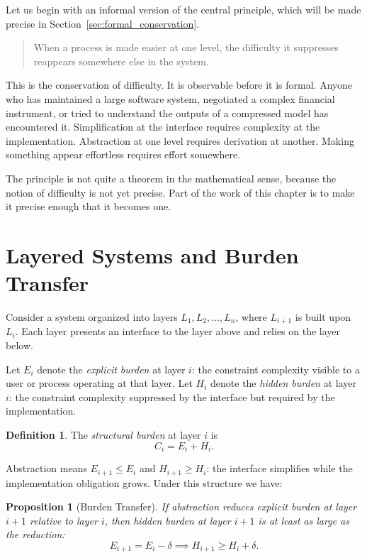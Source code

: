 \documentclass[12pt,a4paper,openany]{book}
\theoremstyle{plain}
\newtheorem{proposition}[theorem]{Proposition}
\theoremstyle{definition}
\newtheorem{definition}[theorem]{Definition}
\theoremstyle{remark}
\begin{document}
Let us begin with an informal version of the central principle, which will be made precise in Section~\ref{sec:formal_conservation}.

\begin{quote}
When a process is made easier at one level, the difficulty it suppresses reappears somewhere else in the system.
\end{quote}

This is the conservation of difficulty. It is observable before it is formal. Anyone who has maintained a large software system, negotiated a complex financial instrument, or tried to understand the outputs of a compressed model has encountered it. Simplification at the interface requires complexity at the implementation. Abstraction at one level requires derivation at another. Making something appear effortless requires effort somewhere.

The principle is not quite a theorem in the mathematical sense, because the notion of difficulty is not yet precise. Part of the work of this chapter is to make it precise enough that it becomes one.

\section{Layered Systems and Burden Transfer}

Consider a system organized into layers $L_1, L_2, \ldots, L_n$, where $L_{i+1}$ is built upon $L_i$. Each layer presents an interface to the layer above and relies on the layer below.

Let $E_i$ denote the \emph{explicit burden} at layer $i$: the constraint complexity visible to a user or process operating at that layer. Let $H_i$ denote the \emph{hidden burden} at layer $i$: the constraint complexity suppressed by the interface but required by the implementation.

\begin{definition}
The \emph{structural burden} at layer $i$ is
\[
C_i = E_i + H_i.
\]
\end{definition}

Abstraction means $E_{i+1} \leq E_i$ and $H_{i+1} \geq H_i$: the interface simplifies while the implementation obligation grows. Under this structure we have:

\begin{proposition}[Burden Transfer]
\label{prop:burden_transfer}
If abstraction reduces explicit burden at layer $i+1$ relative to layer $i$, then hidden burden at layer $i+1$ is at least as large as the reduction:
\[
E_{i+1} = E_i - \delta \implies H_{i+1} \geq H_i + \delta.
\]
\end{proposition}
\end{document}
